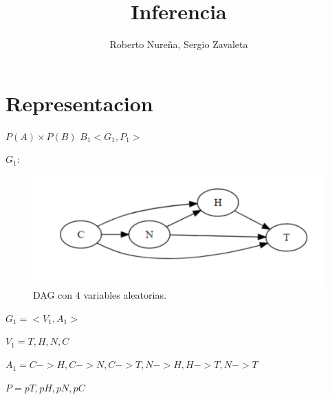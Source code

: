 \documentclass[a4paper]{article}
\title{Inferencia}
\author{Roberto Nureña, Sergio Zavaleta}
\begin{document}
\maketitle


\section{Representacion}
$P(A) \times P(B)$
$B_1<G_1,P_1>$


$G_1:$

\begin{figure}[!h]
\centering
\includegraphics[scale=0.4]{grafo.PNG}
\caption{DAG con 4 variables aleatorias.}
\end{figure}

$G_1=<V_1,A_1>$

$V_1={T,H,N,C}$


$A_1={C->H, C->N, C->T,N->H, H->T,N->T}$

$P={pT,pH,pN,pC}$
\end{document}
